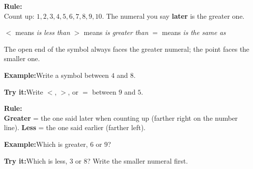 \documentclass[12pt]{article}
\begin{document}

\begin{formulabox}\textbf{Rule:}\\[3pt]
Count up: $1, 2, 3, 4, 5, 6, 7, 8, 9, 10$. The numeral you say \textbf{later}
is the greater one.\par
$<$ means \emph{is less than} \quad $>$ means \emph{is greater than} \quad
$=$ means \emph{is the same as}\par
The open end of the symbol always faces the greater numeral; the point faces
the smaller one.
\end{formulabox}
\begin{examplebox}\textbf{Example:}\quad Write a symbol between $4$ and $8$.
\end{examplebox}
\begin{tryitbox}\textbf{Try it:}\quad Write $<$, $>$, or $=$ between $9$ and
$5$.\\[2pt]
\end{tryitbox}

\begin{formulabox}\textbf{Rule:}\\[3pt]
\textbf{Greater} = the one said later when counting up (farther right on the
number line). \textbf{Less} = the one said earlier (farther left).
\end{formulabox}
\begin{examplebox}\textbf{Example:}\quad Which is greater, $6$ or $9$?
\end{examplebox}
\begin{tryitbox}\textbf{Try it:}\quad Which is less, $3$ or $8$? Write the
smaller numeral first.\\[2pt]
\end{tryitbox}
\end{document}
